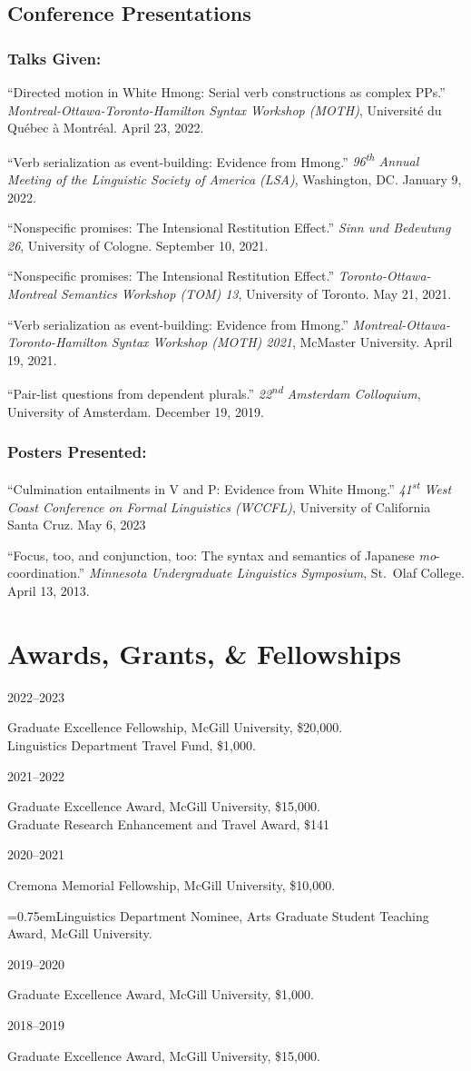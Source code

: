 \documentclass[11pt,oneside,DIV=9,parskip=off]{scrarticle} %
\newlength{\leftcolwidth}
\newlength{\rightcolwidth}
\newlength{\spacingbefore}
\newlength{\spacingafter}
\newcommand{\hang}{\hangindent=0.75em\hangafter=1}
\newcommand{\myonecol}[1]{%
	\vspace{\spacingbefore}%
	\begin{minipage}[t]{\linewidth}%
		\strut#1%
	\end{minipage}%
	\vspace{\spacingafter}\par%
	}
\newcommand{\mytwocol}[2]{%
	\vspace{\spacingbefore}%
	\begin{minipage}[t]{\leftcolwidth}%
		\strut#1%
	\end{minipage}%
	\begin{minipage}[t]{\rightcolwidth}%
		\strut#2%
	\end{minipage}%
	\vspace{\spacingafter}\par%
	}
\newcommand{\talk}[1]{%
	\myonecol{#1}%
	}
\newcommand{\cvline}[2]{%
	\mytwocol{#1}{#2}%
	}
\begin{document}
\subsection{Conference Presentations}
\subsubsection{Talks Given:}
\talk{``Directed motion in White Hmong: Serial verb constructions as complex PPs.'' \textit{Montreal-Ottawa-Toronto-Hamilton Syntax Workshop (MOTH)}, Universit\'e du Qu\'ebec \`a Montr\'eal. April 23, 2022.}
\talk{``Verb serialization as event-building: Evidence from Hmong.'' \textit{96\textsuperscript{th} Annual Meeting of the Linguistic Society of America (LSA)}, Washington, DC. January 9, 2022.}
\talk{``Nonspecific promises: The Intensional Restitution Effect.'' \textit{Sinn und Bedeutung 26}, University of Cologne. September 10, 2021.}
\talk{``Nonspecific promises: The Intensional Restitution Effect.'' \textit{Toronto-Ottawa-Montreal Semantics Workshop (TOM) 13}, University of Toronto. May 21, 2021.}
\talk{``Verb serialization as event-building: Evidence from Hmong.'' \textit{Montreal-Ottawa-Toronto-Hamilton Syntax Workshop (MOTH) 2021}, McMaster University. April 19, 2021.}
\talk{``Pair-list questions from dependent plurals.'' \textit{22\textsuperscript{nd} Amsterdam Colloquium}, University of Amsterdam. December 19, 2019.}

\subsubsection{Posters Presented:}
\talk{``Culmination entailments in V and P: Evidence from White Hmong.'' \textit{41\textsuperscript{st} West Coast Conference on Formal Linguistics (WCCFL)}, University of California Santa Cruz. May 6, 2023}
\talk{``Focus, too, and conjunction, too: The syntax and semantics of Japanese \textit{mo}-coordination.'' \textit{Minnesota Undergraduate Linguistics Symposium}, St.\ Olaf College. April 13, 2013.}

\section{Awards, Grants, \& Fellowships}
\cvline{2022--2023}{Graduate Excellence Fellowship, McGill University, \$20,000.\\Linguistics Department Travel Fund, \$1,000.}
\cvline{2021--2022}{Graduate Excellence Award, McGill University, \$15,000.\\Graduate Research Enhancement and Travel Award, \$141}
\cvline{2020--2021}{Cremona Memorial Fellowship, McGill University, \$10,000.\par \hang Linguistics Department Nominee, Arts Graduate Student Teaching Award, McGill University.}
\cvline{2019--2020}{Graduate Excellence Award, McGill University, \$1,000.}
\cvline{2018--2019}{Graduate Excellence Award, McGill University, \$15,000.}
\end{document}
